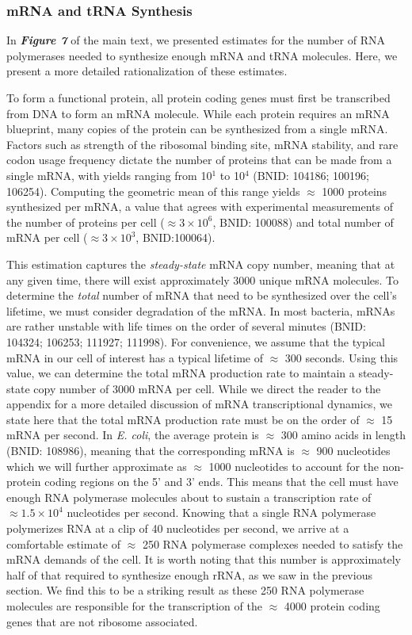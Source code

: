 \subsubsection{mRNA and tRNA Synthesis}
In \textbf{\textit{Figure 7}} of the main text, we presented
estimates for the number of RNA polymerases needed to synthesize enough mRNA
and tRNA molecules. Here, we present a more detailed rationalization of these estimates.

To form a functional protein, all protein coding genes must first be
transcribed from DNA to form an mRNA molecule. While each protein requires an
mRNA blueprint, many copies of the protein can be synthesized from a single
mRNA. Factors such as strength of the ribosomal binding site, mRNA stability,
and rare codon usage frequency dictate the number of proteins that can be
made from a single mRNA, with yields ranging from 10$^1$ to 10$^4$ (BNID:
104186; 100196; 106254). Computing the geometric mean of this range yields
$\approx$ 1000 proteins synthesized per mRNA, a value that agrees with
experimental measurements of the number of proteins per cell ($\approx 3
\times 10^6$, BNID: 100088) and total number of mRNA per cell ($\approx 3
\times 10^3$, BNID:100064).

This estimation captures the \textit{steady-state} mRNA copy number, meaning
that at any given time, there will exist approximately 3000 unique mRNA
molecules. To determine the \textit{total} number of mRNA that need to be
synthesized over the cell's lifetime, we must consider degradation of the
mRNA. In most bacteria, mRNAs are rather unstable with life times on the
order of several minutes (BNID: 104324; 106253; 111927; 111998). For
convenience, we assume that the typical mRNA in our cell of interest has a
typical lifetime of $\approx$ 300 seconds. Using this value, we can determine
the total mRNA production rate to maintain a steady-state copy number of 3000
mRNA per cell. While we direct the reader to the appendix for a more detailed
discussion of mRNA transcriptional dynamics, we state here that the total
mRNA production rate must be on the order of $\approx$ 15 mRNA per second. In
\textit{E. coli}, the average protein is $\approx$ 300 amino acids in length
(BNID: 108986), meaning that the corresponding mRNA is $\approx$ 900
nucleotides which we will further approximate as $\approx$ 1000 nucleotides
to account for the non-protein coding regions on the 5' and 3' ends. This
means that the cell must have enough RNA polymerase molecules about to
sustain a transcription rate of $\approx 1.5 \times 10^4$ nucleotides per
second. Knowing that a single RNA polymerase polymerizes RNA at a clip of 40
nucleotides per second, we arrive at a comfortable estimate of $\approx$ 250
RNA polymerase complexes needed to satisfy the mRNA demands of the cell. It
is worth noting that this number is approximately half of that required to
synthesize enough rRNA, as we saw in the previous section. We find this to be
a striking result as these 250 RNA polymerase molecules are responsible for
the transcription of the $\approx$ 4000 protein coding genes that are not
ribosome associated.

